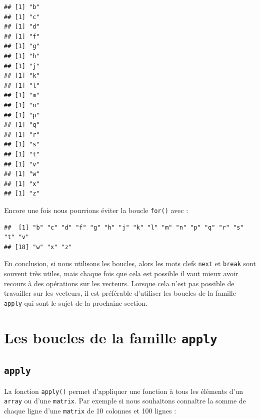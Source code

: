 \documentclass[]{book}
\newenvironment{Shaded}{\begin{snugshade}}{\end{snugshade}}
\newcommand{\KeywordTok}[1]{\textcolor[rgb]{0.13,0.29,0.53}{\textbf{#1}}}
\newcommand{\NormalTok}[1]{#1}
\newcommand{\OperatorTok}[1]{\textcolor[rgb]{0.81,0.36,0.00}{\textbf{#1}}}
\newcommand{\StringTok}[1]{\textcolor[rgb]{0.31,0.60,0.02}{#1}}
\begin{document}
\begin{verbatim}
## [1] "b"
## [1] "c"
## [1] "d"
## [1] "f"
## [1] "g"
## [1] "h"
## [1] "j"
## [1] "k"
## [1] "l"
## [1] "m"
## [1] "n"
## [1] "p"
## [1] "q"
## [1] "r"
## [1] "s"
## [1] "t"
## [1] "v"
## [1] "w"
## [1] "x"
## [1] "z"
\end{verbatim}

Encore une fois nous pourrions éviter la boucle \texttt{for()} avec :

\begin{Shaded}
\end{Shaded}

\begin{verbatim}
##  [1] "b" "c" "d" "f" "g" "h" "j" "k" "l" "m" "n" "p" "q" "r" "s" "t" "v"
## [18] "w" "x" "z"
\end{verbatim}

En conclusion, si nous utilisons les boucles, alors les mots clefs \texttt{next} et \texttt{break} sont souvent très utiles, mais chaque fois que cela est possible il vaut mieux avoir recours à des opérations sur les vecteurs. Lorsque cela n'est pas possible de travailler sur les vecteurs, il est préférable d'utiliser les boucles de la famille \texttt{apply} qui sont le sujet de la prochaine section.

\hypertarget{l17applyfamily}{%
\section{\texorpdfstring{Les boucles de la famille \texttt{apply}}{Les boucles de la famille apply}}\label{l17applyfamily}}

\hypertarget{l17apply}{%
\subsection{\texorpdfstring{\texttt{apply}}{apply}}\label{l17apply}}

La fonction \texttt{apply()} permet d'appliquer une fonction à tous les éléments d'un \texttt{array} ou d'une \texttt{matrix}. Par exemple si nous souhaitons connaître la somme de chaque ligne d'une \texttt{matrix} de 10 colonnes et 100 lignes :
\end{document}
